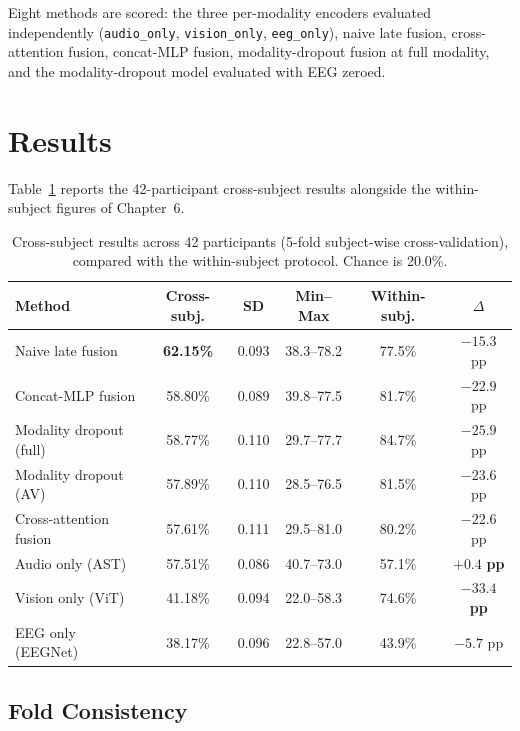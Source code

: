 Eight methods are scored: the three per-modality encoders evaluated independently
(\texttt{audio\_only}, \texttt{vision\_only}, \texttt{eeg\_only}), naive late fusion,
cross-attention fusion, concat-MLP fusion, modality-dropout fusion at full modality,
and the modality-dropout model evaluated with EEG zeroed.

\section{Results}
\label{sec:cs_results}

Table~\ref{tab:cs_main} reports the 42-participant cross-subject results alongside
the within-subject figures of Chapter~6.

\begin{table}[htbp]
\centering
\caption{Cross-subject results across 42 participants (5-fold subject-wise
cross-validation), compared with the within-subject protocol. Chance is 20.0\%.}
\label{tab:cs_main}
\begin{tabular}{lccccc}
\hline
\textbf{Method} & \textbf{Cross-subj.} & \textbf{SD} & \textbf{Min--Max} & \textbf{Within-subj.} & \textbf{$\Delta$} \\
\hline
Naive late fusion      & \textbf{62.15\%} & 0.093 & 38.3--78.2 & 77.5\% & $-15.3$ pp \\
Concat-MLP fusion      & 58.80\% & 0.089 & 39.8--77.5 & 81.7\% & $-22.9$ pp \\
Modality dropout (full)& 58.77\% & 0.110 & 29.7--77.7 & 84.7\% & $-25.9$ pp \\
Modality dropout (AV)  & 57.89\% & 0.110 & 28.5--76.5 & 81.5\% & $-23.6$ pp \\
Cross-attention fusion & 57.61\% & 0.111 & 29.5--81.0 & 80.2\% & $-22.6$ pp \\
Audio only (AST)       & 57.51\% & 0.086 & 40.7--73.0 & 57.1\% & $\mathbf{+0.4}$ \textbf{pp} \\
Vision only (ViT)      & 41.18\% & 0.094 & 22.0--58.3 & 74.6\% & $\mathbf{-33.4}$ \textbf{pp} \\
EEG only (EEGNet)      & 38.17\% & 0.096 & 22.8--57.0 & 43.9\% & $-5.7$ pp \\
\hline
\end{tabular}
\end{table}

\subsection{Fold Consistency}


